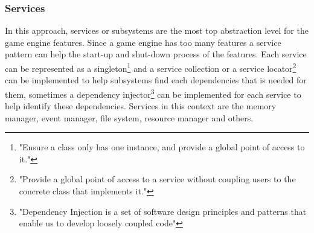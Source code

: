 \subsubsection{Services}
In this approach, services or subsystems are the most top abstraction level for the game engine features. Since a game engine has too many features a service pattern can help the start-up and shut-down process of the features. Each service can be represented as a singleton\footnote{"Ensure a class only has one instance, and provide a global point of access to it."\cite{GangOfFour}} and a service collection or a service locator\footnote{"Provide a global point of access to a service without coupling users to the concrete class that implements it."\cite{GameProgrammingPatterns}} can be implemented to help subsystems find each dependencies that is needed for them, sometimes a dependency injector\footnote{"Dependency Injection is a set of software design principles and patterns that enable us to develop loosely coupled code"\cite{DependencyInjectionIn.NET}} can be implemented for each service to help identify these dependencies. Services in this context are the memory manager, event manager, file system, resource manager and others\cite{GameEngineArchitecture,3DGameEngineArchitecture}.